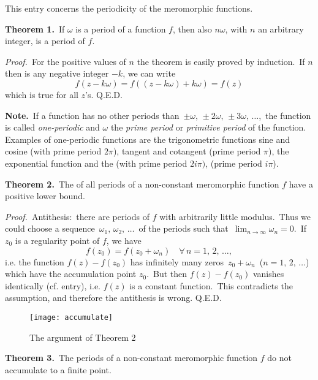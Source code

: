 \documentclass[12pt]{article}
\theoremstyle{definition}
\begin{document}
This entry concerns the periodicity of the meromorphic functions.

\textbf{Theorem 1.}\, If $\omega$ is a period of a function $f$, then also $n\omega$, with $n$ an arbitrary integer, is a period of $f$.

{\em Proof.}\, For the positive values of $n$ the theorem is easily proved by induction.\, If $n$ then is any negative integer $-k$, we can write
$$f(z-k\omega) = f((z\!-\!k\omega)\!+\!k\omega) = f(z)$$
which is true for all $z$'s. Q.E.D.

\textbf{Note.}\, If a function has no other periods than\,  $\pm\omega,\,\pm2\omega,\,\pm3\omega,\,\ldots$,\, the function is called {\em one-periodic} and $\omega$ the {\em prime period} or {\em primitive period} of the function.\, Examples of one-periodic functions are the trigonometric functions sine and cosine (with prime period $2\pi$), tangent and cotangent (prime period $\pi$), the exponential function and the  (with prime period $2i\pi)$,  (prime period $i\pi$).

\textbf{Theorem 2.}\, The  of all periods of a non-constant meromorphic function $f$ have a positive lower bound.

{\em Proof.}\, Antithesis:\, there are periods of $f$ with arbitrarily little modulus.\, Thus we could choose a sequence\, $\omega_1,\,\omega_2,\,\ldots$\, of the periods such that\, $\lim_{n\to\infty}\omega_n = 0$.\, If $z_0$ is a regularity point of $f$, we have 
$$f(z_0) = f(z_0+\omega_n)\quad\forall\, n = 1,\,2,\,\ldots,$$
i.e. the function $f(z)\!-\!f(z_0)$ has infinitely many zeros\, $z_0+\omega_n$\, ($n = 1,\,2,\,\ldots$)\, which have the accumulation point $z_0$.\, But then $f(z)\!-\!f(z_0)$ vanishes identically (cf.  entry), i.e. $f(z)$ is a constant function.\, This contradicts the assumption, and therefore the antithesis is wrong. Q.E.D.

\begin{figure}
\begin{center}
\texttt{[image: accumulate]}
\end{center}
\caption{The argument of Theorem 2}
\end{figure}

\textbf{Theorem 3.}\, The periods of a non-constant meromorphic function $f$ do not accumulate to a finite point.
\end{document}
